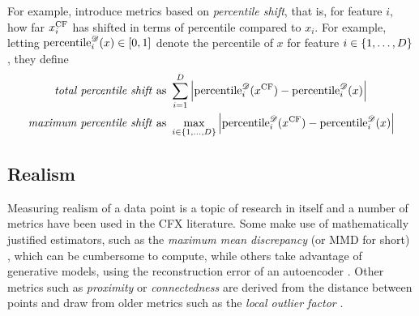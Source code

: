 \documentclass[../main.tex]{subfiles}
\begin{document}
For example, \citeauthor{pawelczykLearning2020} introduce metrics based on \emph{percentile shift}, that is, for feature $i$, how far $x^\mathrm{CF}_i$ has shifted in terms of percentile compared to $x_i$.
For example, letting $\text{percentile}_i^{\mathscr{D}}(x) \in [0, 1]$ denote the percentile of $x$ for feature $i \in \{1, \ldots, D\}$, they define
\begin{align*}
    \text{\emph{total percentile shift} as }   & \sum_{i=1}^D \left\lvert \text{percentile}_i^{\mathscr{D}}(x^\mathrm{CF}) - \text{percentile}_i^{\mathscr{D}}(x) \right\rvert                  \\
    \text{\emph{maximum percentile shift} as } & \max_{i \in \{1, \ldots, D\}} \left\lvert \text{percentile}_i^{\mathscr{D}}(x^\mathrm{CF}) - \text{percentile}_i^{\mathscr{D}}(x) \right\rvert
\end{align*}


\subsection{Realism}

Measuring realism of a data point is a topic of research in itself and a number of metrics have been used in the CFX literature.
Some make use of mathematically justified estimators, such as the \emph{maximum mean discrepancy} (or MMD for short) \cite{zhangInterpretable2022}, which can be cumbersome to compute, while others take advantage of generative models, \eg{} using the reconstruction error of an autoencoder \cite{vanlooverenInterpretable2021}.
Other metrics such as \emph{proximity} or \emph{connectedness} \cite{laugelIssues2019} are derived from the distance between points and draw from older metrics such as the \emph{local outlier factor} \cite{breunigLOF2000}.
\end{document}
